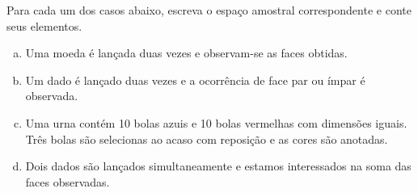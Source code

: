 %
%


\begin{exercicioBanco}[\valorquestao]
Para cada um dos casos abaixo, escreva o espaço amostral correspondente e conte seus elementos.
%
\begin{enumerate}[(a)]
    \item Uma moeda é lançada duas vezes e observam-se as faces obtidas.
    \item Um dado é lançado duas vezes e a ocorrência de face par ou ímpar é observada.
    \item Uma urna contém 10 bolas azuis e 10 bolas vermelhas com dimensões iguais. Três bolas são selecionas ao acaso com reposição e as cores são anotadas.
    \item Dois dados são lançados simultaneamente e estamos interessados na soma das faces observadas.
\end{enumerate}
%
\end{exercicioBanco}

